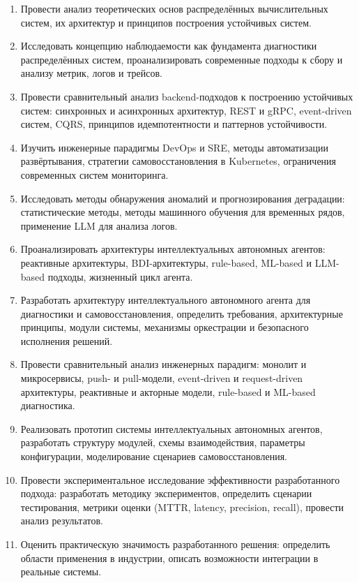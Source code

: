 \begin{enumerate}
    \item Провести анализ теоретических основ распределённых вычислительных систем, их архитектур и принципов построения устойчивых систем.

    \item Исследовать концепцию наблюдаемости как фундамента диагностики распределённых систем, проанализировать современные подходы к сбору и анализу метрик, логов и трейсов.

    \item Провести сравнительный анализ backend-подходов к построению устойчивых систем: синхронных и асинхронных архитектур, REST и gRPC, event-driven систем, CQRS, принципов идемпотентности и паттернов устойчивости.

    \item Изучить инженерные парадигмы DevOps и SRE, методы автоматизации развёртывания, стратегии самовосстановления в Kubernetes, ограничения современных систем мониторинга.

    \item Исследовать методы обнаружения аномалий и прогнозирования деградации: статистические методы, методы машинного обучения для временных рядов, применение LLM для анализа логов.

    \item Проанализировать архитектуры интеллектуальных автономных агентов: реактивные архитектуры, BDI-архитектуры, rule-based, ML-based и LLM-based подходы, жизненный цикл агента.

    \item Разработать архитектуру интеллектуального автономного агента для диагностики и самовосстановления, определить требования, архитектурные принципы, модули системы, механизмы оркестрации и безопасного исполнения решений.

    \item Провести сравнительный анализ инженерных парадигм: монолит и микросервисы, push- и pull-модели, event-driven и request-driven архитектуры, реактивные и акторные модели, rule-based и ML-based диагностика.

    \item Реализовать прототип системы интеллектуальных автономных агентов, разработать структуру модулей, схемы взаимодействия, параметры конфигурации, моделирование сценариев самовосстановления.

    \item Провести экспериментальное исследование эффективности разработанного подхода: разработать методику экспериментов, определить сценарии тестирования, метрики оценки (MTTR, latency, precision, recall), провести анализ результатов.

    \item Оценить практическую значимость разработанного решения: определить области применения в индустрии, описать возможности интеграции в реальные системы.
\end{enumerate}

